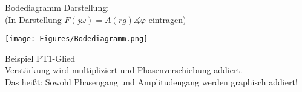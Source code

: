 Bodediagramm Darstellung:\\ 
(In Darstellung $F(j \omega) = A(rg) \measuredangle \varphi$ eintragen)
\begin{center}
	\texttt{[image: Figures/Bodediagramm.png]}
\end{center}
\begin{mdframed}[style=exercise]



	Beispiel PT1-Glied\\
	Verstärkung wird multipliziert und Phasenverschiebung addiert.\\ Das
	heißt: Sowohl Phasengang und Amplitudengang werden graphisch addiert!
\end{mdframed}



